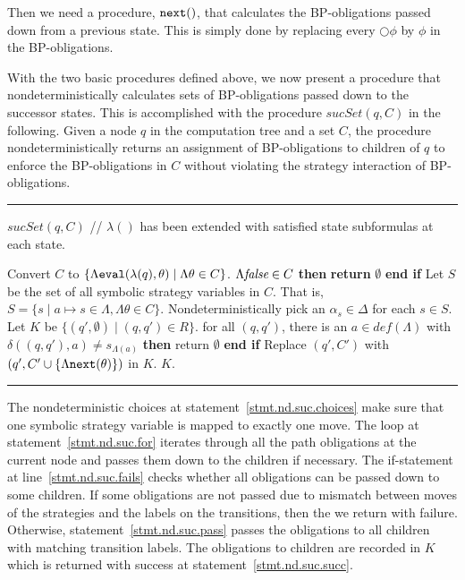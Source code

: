\documentclass[11pt]{article}
\newcommand{\IFNLINE}[1]{\STATE {\bf if} #1 {\bf then} }
\newcommand{\ENDIFLINE}{\textbf{end if}}
\newcommand{\RETLINE}{\textbf{return} }
\newcommand{\procbegin}{\vspace*{3mm}\hrule\noindent}
\newcommand{\procend}{\vspace*{1mm}\hrule\vspace{3mm}}
\newcommand{\ttsynsuc}{\textit{sucSet}}
\newcommand{\tteval}{\mbox{\tt eval}}
\newcommand{\ttnxt}{\mbox{\tt next}}
\newcommand{\emdef}{\textit{def}}
\newcommand{\false}{\mbox{\em false}}
\newcommand{\nxt}{\bigcirc}
\begin{document}
Then we need a procedure, $\ttnxt()$, that calculates the BP-obligations 
passed down from a previous state. 
This is simply done by replacing every $\nxt\phi$ by $\phi$ in the 
BP-obligations.  

With the two basic procedures defined above, 
we now present a procedure that nondeterministically calculates 
sets of BP-obligations passed down to the successor states. 
This is accomplished with the procedure $\ttsynsuc(q,C)$ 
in the following.  
Given a node $q$ in the computation tree and
a set $C$, the procedure 
nondeterministically returns an assignment of BP-obligations 
to children of $q$ to enforce the BP-obligations in $C$
without violating the strategy interaction of BP-obligations.  
\procbegin
$\ttsynsuc(q,C)$ // $\lambda()$ has been extended with 
			satisfied state subformulas at each state. 
\begin{algorithmic}[1]
\STATE Convert $C$ to 
  $\{\Lambda\tteval(\lambda(q),\theta)\mid \Lambda\theta\in C\}$.  
\IFNLINE {$\Lambda\false\in C$} \RETLINE $\emptyset$ \ENDIFLINE 
\STATE Let $S$ be the set of all symbolic strategy variables in $C$.  
  That is, $S=\{s\mid a\mapsto s\in \Lambda, \Lambda\theta\in C\}$. 
\STATE Nondeterministically pick an $\alpha_s\in \Delta$ for each 
	$s\in S$.  \label{stmt.nd.suc.choices} 
\STATE Let $K$ be $\{(q',\emptyset)\mid (q,q')\in R\}$.  
  	\label{stmt.nd.suc.for}
  \IFNLINE {for all $(q,q')$, there is an $a\in\emdef(\Lambda)$
   \label{stmt.nd.suc.fails} 
    with $\delta((q,q'),a)\neq s_{\Lambda(a)}$} 
    return $\emptyset$ 
  \ENDIFLINE 
  \FOR {$(q',C')\in \Delta$ with $\forall a\in\emdef(\Lambda)
  	(\delta((q,q'),a)=s_{\Lambda(a)})$} \label{stmt.nd.suc.pass}  
      \STATE Replace $(q',C')$ with 
        $(q',C'\cup\{\Lambda\ttnxt(\theta)\})$ in $K$.
    \ENDFOR
\ENDFOR 
\RETURN $K$.\label{stmt.nd.suc.succ} 
\end{algorithmic}
\procend
The nondeterministic choices at statement~\ref{stmt.nd.suc.choices} 
make sure that one symbolic strategy variable is mapped to exactly one move.  
The loop at statement~\ref{stmt.nd.suc.for} iterates through
all the path obligations at the current node and passes them down to
the children if necessary.
The if-statement at line~\ref{stmt.nd.suc.fails} checks 
whether all obligations can be passed down to some children.  
If some obligations are not passed due to mismatch between moves of the strategies 
and the labels on the transitions, then 
the we return with failure.  
Otherwise, 
statement~\ref{stmt.nd.suc.pass} passes 
the obligations to all children with matching transition labels. 
The obligations to children are recorded in $K$ which is returned with success 
at statement~\ref{stmt.nd.suc.succ}.  
\end{document}
